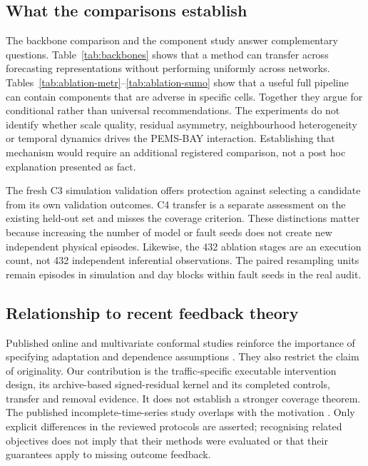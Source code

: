 \documentclass[pdflatex,sn-mathphys-num]{sn-jnl}
\begin{document}
\subsection{What the comparisons establish}
The backbone comparison and the component study answer complementary questions. Table~\ref{tab:backbones} shows that a method can transfer across forecasting representations without performing uniformly across networks. Tables~\ref{tab:ablation-metr}--\ref{tab:ablation-sumo} show that a useful full pipeline can contain components that are adverse in specific cells. Together they argue for conditional rather than universal recommendations. The experiments do not identify whether scale quality, residual asymmetry, neighbourhood heterogeneity or temporal dynamics drives the PEMS-BAY interaction. Establishing that mechanism would require an additional registered comparison, not a post hoc explanation presented as fact.

The fresh C3 simulation validation offers protection against selecting a candidate from its own validation outcomes. C4 transfer is a separate assessment on the existing held-out set and misses the coverage criterion. These distinctions matter because increasing the number of model or fault seeds does not create new independent physical episodes. Likewise, the 432 ablation stages are an execution count, not 432 independent inferential observations. The paired resampling units remain episodes in simulation and day blocks within fault seeds in the real audit.

\subsection{Relationship to recent feedback theory}
Published online and multivariate conformal studies reinforce the importance of specifying adaptation and dependence assumptions \citep{gibbs2024,schlembach2025,zhou2025}. They also restrict the claim of originality. Our contribution is the traffic-specific executable intervention design, its archive-based signed-residual kernel and its completed controls, transfer and removal evidence. It does not establish a stronger coverage theorem. The published incomplete-time-series study overlaps with the motivation \citep{chen2026}. Only explicit differences in the reviewed protocols are asserted; recognising related objectives does not imply that their methods were evaluated or that their guarantees apply to missing outcome feedback.
\end{document}
